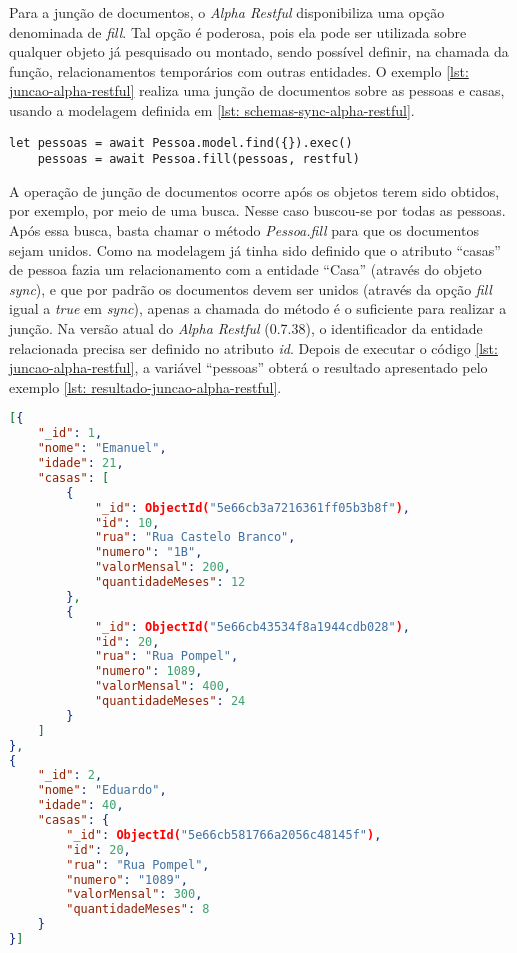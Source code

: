 Para a junção de documentos, o \textit{Alpha Restful} disponibiliza uma opção denominada de \textit{fill}. Tal opção é poderosa, pois ela pode ser utilizada sobre qualquer objeto já pesquisado ou montado, sendo possível definir, na chamada da função, relacionamentos temporários com outras entidades. O exemplo \ref{lst: juncao-alpha-restful} realiza uma junção de documentos sobre as pessoas e casas, usando a modelagem definida em \ref{lst: schemas-sync-alpha-restful}.

\begin{lstlisting}[style=ES6, caption={Junção de Documentos Com o \textit{Alpha Restful}\label{lst: juncao-alpha-restful}}]
	let pessoas = await Pessoa.model.find({}).exec()
	pessoas = await Pessoa.fill(pessoas, restful)
\end{lstlisting}

A operação de junção de documentos ocorre após os objetos terem sido obtidos, por exemplo, por meio de uma busca. Nesse caso buscou-se por todas as pessoas. Após essa busca, basta chamar o método \textit{Pessoa.fill} para que os documentos sejam unidos. Como na modelagem já tinha sido definido que o atributo ``casas'' de pessoa fazia um relacionamento com a entidade ``Casa'' (através do objeto \textit{sync}), e que por padrão os documentos devem ser unidos (através da opção \textit{fill} igual a \textit{true} em \textit{sync}), apenas a chamada do método é o suficiente para realizar a junção. Na versão atual do \textit{Alpha Restful} (0.7.38), o identificador da entidade relacionada precisa ser definido no atributo \textit{id}. Depois de executar o código \ref{lst: juncao-alpha-restful}, a variável ``pessoas'' obterá o resultado apresentado pelo exemplo \ref{lst: resultado-juncao-alpha-restful}.


\begin{lstlisting}[language=json, caption={Resultado da Junção de Documentos Com o \textit{Alpha Restful}\label{lst: resultado-juncao-alpha-restful}}]
[{
    "_id": 1,
    "nome": "Emanuel",
    "idade": 21,
    "casas": [
        {
            "_id": ObjectId("5e66cb3a7216361ff05b3b8f"),
            "id": 10,
            "rua": "Rua Castelo Branco",
            "numero": "1B",
            "valorMensal": 200,
            "quantidadeMeses": 12
        },
        {
            "_id": ObjectId("5e66cb43534f8a1944cdb028"),
            "id": 20,
            "rua": "Rua Pompel",
            "numero": 1089,
            "valorMensal": 400,
            "quantidadeMeses": 24
        }
    ]
},
{
    "_id": 2,
    "nome": "Eduardo",
    "idade": 40,
    "casas": {
        "_id": ObjectId("5e66cb581766a2056c48145f"),
        "id": 20,
        "rua": "Rua Pompel",
        "numero": "1089",
        "valorMensal": 300,
        "quantidadeMeses": 8
    }
}]
\end{lstlisting}

